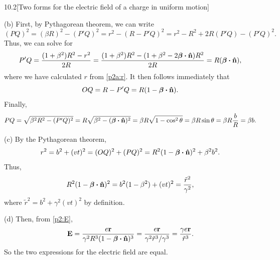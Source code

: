 \documentclass[12pt]{article}
\begin{document}
\begin{problem}{10.2}[Two forms for the electric field of a charge in uniform
    motion]
\begin{solution}
(b) First, by Pythagorean theorem, we can write
\begin{equation}
    (PQ)^2=(\beta R)^2-(P'Q)^2=r^2-(R-P'Q)^2
    =r^2-R^2+2R(P'Q)-(P'Q)^2.
\end{equation}
Thus, we can solve for
\begin{equation}
    P'Q=\frac{(1+\beta^2)R^2-r^2}{2R}
    =\frac{(1+\beta^2)R^2-(1+\beta^2-2\bm\beta\vdot\nhat)R^2}{2R}
    =R(\bm\beta\vdot\nhat),
\end{equation}
where we have calculated $r$ from \eqref{p2a:r}. It then follows immediately 
that
\begin{equation}
    OQ=R-P'Q=R(1-\bm\beta\vdot\nhat) .
\end{equation}
Finally,
\begin{equation}
    PQ=\sqrt{\beta^2R^2-(P'Q)^2}
    =R\sqrt{\beta^2-(\bm\beta\vdot\nhat)^2}
    =\beta R\sqrt{1-\cos^2\theta}
    =\beta R\sin\theta
    =\beta R\frac{b}{R}
    =\beta b.
\end{equation}

(c) By the Pythagorean theorem,
\begin{equation}
    r^2=b^2+(vt)^2=(OQ)^2+(PQ)^2
    =R^2(1-\bm\beta\vdot\nhat)^2+\beta^2b^2.
\end{equation}
Thus,
\begin{equation}
    R^2(1-\bm\beta\vdot\nhat)^2=b^2(1-\beta^2)+(vt)^2
    =\frac{\tilde{r}^2}{\gamma^2},
\end{equation}
where $\tilde{r}^2=b^2+\gamma^2(vt)^2$ by definition.

(d) Then, from \eqref{p2:E},
\begin{align}
    \vb{E}=\frac{e\vb{r}}{\gamma^2R^3(1-\bm\beta\vdot\nhat)^3}
    =\frac{e\vb{r}}{\gamma^2\tilde{r}^3/\gamma^3}
    =\frac{\gamma e\vb{r}}{\tilde{r}^3}.
\end{align}
So the two expressions for the electric field are equal.
\end{solution}
\end{problem}
\newpage
\end{document}
